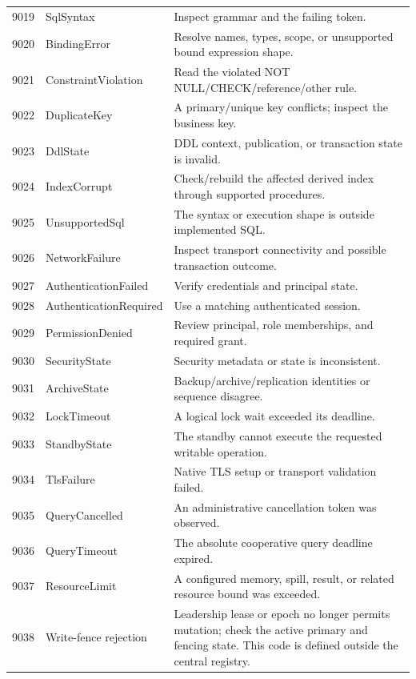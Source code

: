 \begin{longtable}{p{.1\linewidth}p{.27\linewidth}p{.52\linewidth}}
9019 & SqlSyntax & Inspect grammar and the failing token. \\
9020 & BindingError & Resolve names, types, scope, or unsupported bound expression shape. \\
9021 & ConstraintViolation & Read the violated NOT NULL/CHECK/reference/other rule. \\
9022 & DuplicateKey & A primary/unique key conflicts; inspect the business key. \\
9023 & DdlState & DDL context, publication, or transaction state is invalid. \\
9024 & IndexCorrupt & Check/rebuild the affected derived index through supported procedures. \\
9025 & UnsupportedSql & The syntax or execution shape is outside implemented SQL. \\
9026 & NetworkFailure & Inspect transport connectivity and possible transaction outcome. \\
9027 & AuthenticationFailed & Verify credentials and principal state. \\
9028 & AuthenticationRequired & Use a matching authenticated session. \\
9029 & PermissionDenied & Review principal, role memberships, and required grant. \\
9030 & SecurityState & Security metadata or state is inconsistent. \\
9031 & ArchiveState & Backup/archive/replication identities or sequence disagree. \\
9032 & LockTimeout & A logical lock wait exceeded its deadline. \\
9033 & StandbyState & The standby cannot execute the requested writable operation. \\
9034 & TlsFailure & Native TLS setup or transport validation failed. \\
9035 & QueryCancelled & An administrative cancellation token was observed. \\
9036 & QueryTimeout & The absolute cooperative query deadline expired. \\
9037 & ResourceLimit & A configured memory, spill, result, or related resource bound was exceeded. \\
9038 & Write-fence rejection & Leadership lease or epoch no longer permits mutation; check the active primary and fencing state. This code is defined outside the central registry. \\
\bottomrule
\end{longtable}

